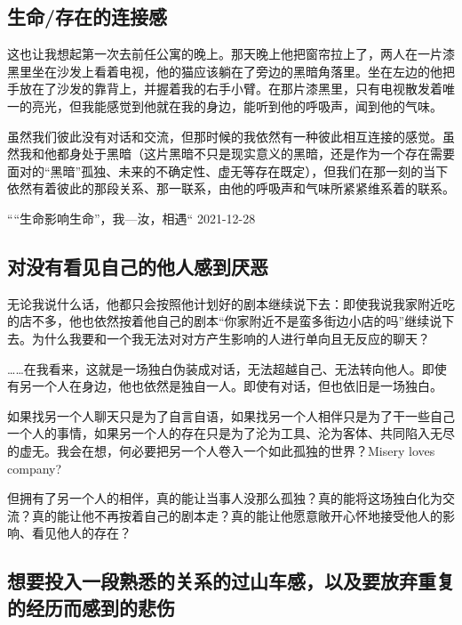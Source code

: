 

\subsection*{生命/存在的连接感}

这也让我想起第一次去前任公寓的晚上。那天晚上他把窗帘拉上了，两人在一片漆黑里坐在沙发上看着电视，他的猫应该躺在了旁边的黑暗角落里。坐在左边的他把手放在了沙发的靠背上，并握着我的右手小臂。在那片漆黑里，只有电视散发着唯一的亮光，但我能感觉到他就在我的身边，能听到他的呼吸声，闻到他的气味。

虽然我们彼此没有对话和交流，但那时候的我依然有一种彼此相互连接的感觉。虽然我和他都身处于黑暗（这片黑暗不只是现实意义的黑暗，还是作为一个存在需要面对的“黑暗”\pozhehao{}孤独、未来的不确定性、虚无等存在既定），但我们在那一刻的当下依然有着彼此的那段关系、那一联系，由他的呼吸声和气味所紧紧维系着的联系。

\pozhehao{}““生命影响生命”，我—汝，相遇“ 2021-12-28


\subsection*{对没有看见自己的他人感到厌恶}

无论我说什么话，他都只会按照他计划好的剧本继续说下去：即使我说我家附近吃的店不多，他也依然按着他自己的剧本\pozhehao{}“你家附近不是蛮多街边小店的吗”\pozhehao{}继续说下去。为什么我要和一个我无法对对方产生影响的人进行单向且无反应的聊天？

……在我看来，这就是一场独白伪装成对话，无法超越自己、无法转向他人。即使有另一个人在身边，他也依然是独自一人。即使有对话，但也依旧是一场独白。

如果找另一个人聊天只是为了自言自语，如果找另一个人相伴只是为了干一些自己一个人的事情，如果另一个人的存在只是为了沦为工具、沦为客体、共同陷入无尽的虚无。我会在想，何必要把另一个人卷入一个如此孤独的世界？Misery loves company?

但拥有了另一个人的相伴，真的能让当事人没那么孤独？真的能将这场独白化为交流？真的能让他不再按着自己的剧本走？真的能让他愿意敞开心怀地接受他人的影响、看见他人的存在？



\subsection*{想要投入一段熟悉的关系的过山车感，以及要放弃重复的经历而感到的悲伤}

